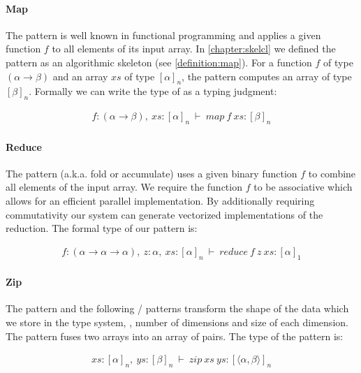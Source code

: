 \paragraph{Map}
The  pattern is well known in functional programming and applies a given function $f$ to all elements of its input array.
In \autoref{chapter:skelcl} we defined the  pattern as an algorithmic skeleton (see \autoref{definition:map}).
For a function $f$ of type $(\alpha \rightarrow \beta)$ and an array $xs$ of type $[\alpha]_n$, the  pattern computes an array of type $[\beta]_n$.
Formally we can write the type of  as a typing judgment:

\begin{align}
  f : (\alpha \rightarrow \beta),\ xs : [\alpha]_n\ \vdash\ map\ f\ xs : [\beta]_n
  \label{eq:type:map}
\end{align}

\paragraph{Reduce}
The  pattern (a.k.a. fold or accumulate) uses a given binary function $f$ to combine all elements of the input array.
We require the function $f$ to be associative which allows for an efficient parallel implementation.
By additionally requiring commutativity our system can generate vectorized implementations of the reduction.
The formal type of our  pattern is:

\begin{align}
  f : (\alpha \rightarrow \alpha \rightarrow \alpha),\ z : \alpha,\ xs : [\alpha]_n\ \vdash\ reduce\ f\ z\ xs : [\alpha]_1
  \label{eq:type:reduce}
\end{align}


\paragraph{Zip}
The  pattern and the following / patterns transform the shape of the data which we store in the type system, \ie, number of dimensions and size of each dimension.
The  pattern fuses two arrays into an array of pairs.
The type of the  pattern is:

\begin{align}
  xs : [\alpha]_n,\ ys : [\beta]_n\ \vdash\ zip\ xs\ ys : [\langle\alpha, \beta\rangle]_n
\end{align}


